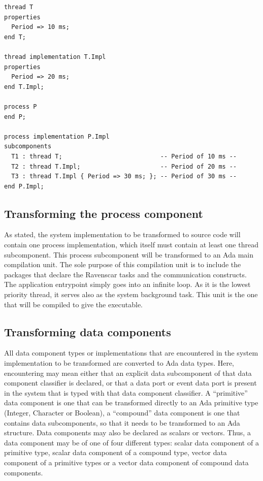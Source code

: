 \begin{minipage}[htbp]{\listingwidth}
\lstset{language=aadl}
\begin{lstlisting}[label=lst:effective_prop, caption=The various
    property overriding options]
thread T
properties
  Period => 10 ms;
end T;

thread implementation T.Impl
properties
  Period => 20 ms;
end T.Impl;

process P
end P;

process implementation P.Impl
subcomponents
  T1 : thread T;                           -- Period of 10 ms --
  T2 : thread T.Impl;                      -- Period of 20 ms --
  T3 : thread T.Impl { Period => 30 ms; }; -- Period of 30 ms --
end P.Impl;
\end{lstlisting}
\end{minipage}

\subsection{Transforming the process component}
As stated, the system implementation to be transformed to source code
will contain one process implementation, which itself must contain at
least one thread subcomponent. This process subcomponent will be
transformed to an Ada main compilation unit. The sole purpose of this
compilation unit is to include the packages that declare the Ravenscar
tasks and the communication constructs. The application entrypoint
simply goes into an infinite loop. As it is the lowest priority
thread, it serves also as the system background task. This unit is the
one that will be compiled to give the executable.

\subsection{Transforming data components}
All data component types or implementations that are encountered in
the system implementation to be transformed are converted to Ada data
types. Here, encountering may mean either that an explicit data
subcomponent of that data component classifier is declared, or that a
data port or event data port is present in the system that is typed
with that data component classifier. A ``primitive'' data component is
one that can be transformed directly to an Ada primitive type
(Integer, Character or Boolean), a ``compound'' data component is one
that contains data subcomponents, so that it needs to be transformed
to an Ada  structure. Data components may also be declared
as scalars or vectors. Thus, a data component may be of one of four
different types: scalar data component of a primitive type, scalar
data component of a compound type, vector data component of a
primitive types or a vector data component of compound data
components.

